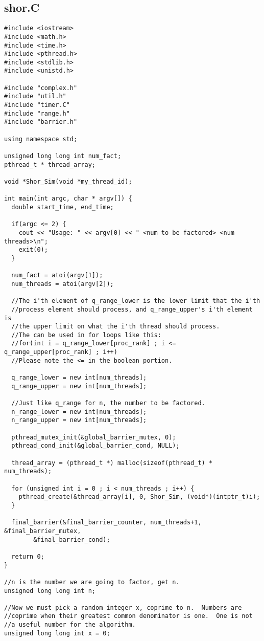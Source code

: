 \documentclass[]{article}
\begin{document}
\subsection{shor.C}
\begin{verbatim}
#include <iostream>
#include <math.h>
#include <time.h>
#include <pthread.h>
#include <stdlib.h>
#include <unistd.h>

#include "complex.h"
#include "util.h"
#include "timer.C"
#include "range.h"
#include "barrier.h"

using namespace std;

unsigned long long int num_fact;
pthread_t * thread_array;

void *Shor_Sim(void *my_thread_id);

int main(int argc, char * argv[]) {
  double start_time, end_time;

  if(argc <= 2) {
    cout << "Usage: " << argv[0] << " <num to be factored> <num threads>\n";
    exit(0);
  }
  
  num_fact = atoi(argv[1]);
  num_threads = atoi(argv[2]);
 
  //The i'th element of q_range_lower is the lower limit that the i'th
  //process element should process, and q_range_upper's i'th element is
  //the upper limit on what the i'th thread should process.
  //The can be used in for loops like this:
  //for(int i = q_range_lower[proc_rank] ; i <= q_range_upper[proc_rank] ; i++)
  //Please note the <= in the boolean portion.
  
  q_range_lower = new int[num_threads];
  q_range_upper = new int[num_threads];

  //Just like q_range for n, the number to be factored.
  n_range_lower = new int[num_threads];
  n_range_upper = new int[num_threads];

  pthread_mutex_init(&global_barrier_mutex, 0);
  pthread_cond_init(&global_barrier_cond, NULL);

  thread_array = (pthread_t *) malloc(sizeof(pthread_t) * num_threads);

  for (unsigned int i = 0 ; i < num_threads ; i++) {
    pthread_create(&thread_array[i], 0, Shor_Sim, (void*)(intptr_t)i);
  }

  final_barrier(&final_barrier_counter, num_threads+1, &final_barrier_mutex, 
		&final_barrier_cond);
  
  return 0;
}

//n is the number we are going to factor, get n.
unsigned long long int n;

//Now we must pick a random integer x, coprime to n.  Numbers are
//coprime when their greatest common denominator is one.  One is not
//a useful number for the algorithm.
unsigned long long int x = 0;


\end{verbatim}
\end{document}
